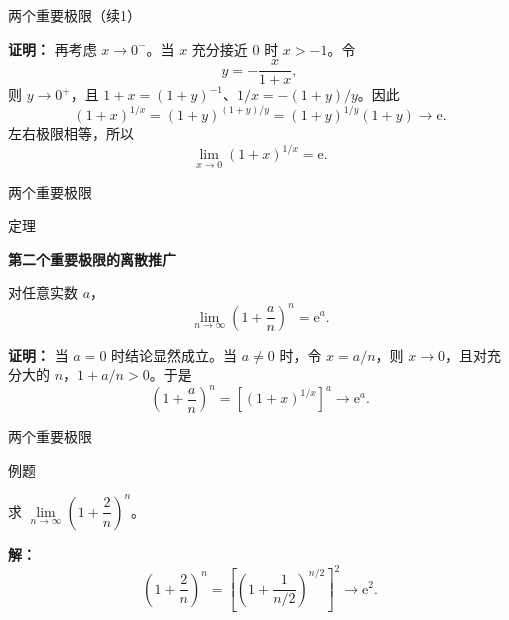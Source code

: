 \documentclass[aspectratio=169,10pt,fontset=fandol]{ctexbeamer}
\newcommand{\ee}{\mathrm{e}}
\begin{document}
\begin{frame}[t,fragile]{两个重要极限（续1）}
\footnotesize
{\footnotesize
\textbf{证明：}
再考虑 \(x\to0^-\)。当 \(x\) 充分接近 \(0\) 时 \(x>-1\)。令
\[
y=-\frac{x}{1+x},
\]
则 \(y\to0^+\)，且 \(1+x=(1+y)^{-1}\)、\(1/x=-(1+y)/y\)。因此
\[
(1+x)^{1/x}
=(1+y)^{(1+y)/y}
=(1+y)^{1/y}(1+y)\to\ee.
\]
左右极限相等，所以
\[
\lim_{x\to0}(1+x)^{1/x}=\ee.
\]

}
\end{frame}
\begin{frame}[t,fragile]{两个重要极限}
\footnotesize
\begin{block}{定理}
{\footnotesize
\textbf{第二个重要极限的离散推广}\par

对任意实数 \(a\)，
\[
\lim_{n\to\infty}\left(1+\frac an\right)^n=\ee^a.
\]

}
\end{block}
\pause
{\footnotesize
\textbf{证明：}
当 \(a=0\) 时结论显然成立。当 \(a\neq0\) 时，令 \(x=a/n\)，则 \(x\to0\)，且对充分大的 \(n\)，\(1+a/n>0\)。于是
\[
\left(1+\frac an\right)^n
=\left[(1+x)^{1/x}\right]^a\longrightarrow\ee^a.
\]

}
\end{frame}
\begin{frame}[t,fragile]{两个重要极限}
\footnotesize
\begin{block}{例题}
{\footnotesize
求 \(\lim\limits_{n\to\infty} \left(1 + \dfrac{2}{n}\right)^n\)。

}
\end{block}
\pause
{\footnotesize
\textbf{解：}
\[
	\left(1 + \dfrac{2}{n}\right)^n = \left[\left(1 + \dfrac{1}{n/2}\right)^{n/2}\right]^2 \to \ee^2.
	\]

}
\end{frame}
\end{document}
